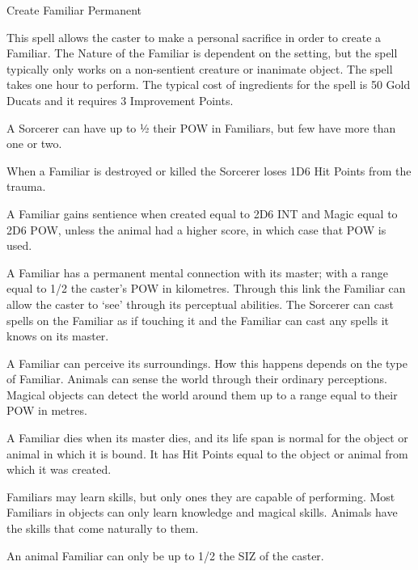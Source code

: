 \begin{samepage}
\begin{rpg-spell}
{Create Familiar}
{Permanent}

This spell allows the caster to make a personal sacrifice in order to create a Familiar. The Nature of the Familiar is dependent on the setting, but the spell typically only works on a non-sentient creature or inanimate object. The spell takes one hour to perform. The typical cost of ingredients for the spell is 50 Gold Ducats and it requires 3 Improvement Points. 

\begin{rpg-list}
\item A Sorcerer can have up to ½ their POW in Familiars, but few have more than one or two.
\item When a Familiar is destroyed or killed the Sorcerer loses 1D6 Hit Points from the trauma.
\item A Familiar gains sentience when created equal to 2D6 INT and Magic equal to 2D6 POW, unless the animal had a higher score, in which case that POW is used. 
\item A Familiar has a permanent mental connection with its master; with a range equal to 1/2 the caster’s POW in kilometres. Through this link the Familiar can allow the caster to ‘see’ through its perceptual abilities. The Sorcerer can cast spells on the Familiar as if touching it and the Familiar can cast any spells it knows on its master.
\item A Familiar can perceive its surroundings. How this happens depends on the type of Familiar. Animals can sense the world through their ordinary perceptions. Magical objects can detect the world around them up to a range equal to their POW in metres.
\item A Familiar dies when its master dies, and its life span is normal for the object or animal in which it is bound. It has Hit Points equal to the object or animal from which it was created.
\item Familiars may learn skills, but only ones they are capable of performing. Most Familiars in objects can only learn knowledge and magical skills. Animals have the skills that come naturally to them.
\item An animal Familiar can only be up to 1/2 the SIZ of the caster. 
\end{rpg-list}

\end{rpg-spell}
\end{samepage}


